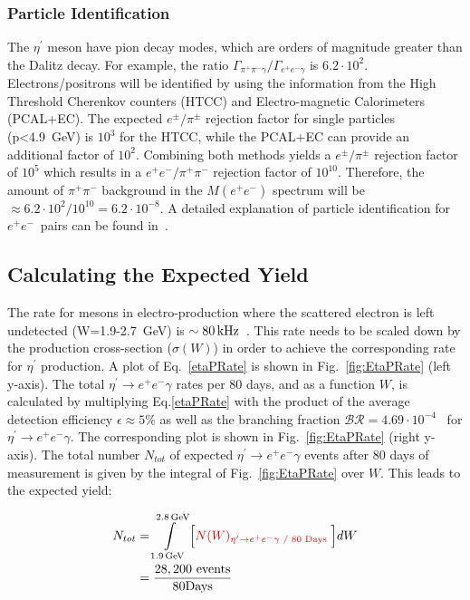 \documentclass[11pt,a4paper,twocolumn]{article}
\def\etaP{\eta^{\prime}}
\def\epemT{$ e^+e^-  $}
\def\epem{e^+e^-}
\begin{document}
\subsubsection{Particle Identification}
The $\etaP$ meson have pion decay modes, which are orders of magnitude greater than the Dalitz decay. For example, the ratio $\Gamma_{\pi^+\pi^-\gamma} / \Gamma_{e^+e^- \gamma} $ is $ 6.2\cdot 10^2$. 
Electrons/positrons will be identified by using the information from the High Threshold Cherenkov counters (HTCC) and Electro-magnetic Calorimeters (PCAL+EC). The expected $e^\pm/\pi^\pm$ rejection factor for single particles (p<4.9~GeV) is $10^3$ for the HTCC, while the PCAL+EC can provide an additional factor of $10^2$. Combining both methods yields a $e^\pm/\pi^\pm$ rejection factor of $10^5$ which results in a $e^+e^-/\pi^+\pi^-$ rejection factor of $10^{10}$. Therefore, the amount of $\pi^+\pi^-$ background in the $M(\epem)$ spectrum will be $\approx 6.2\cdot 10^2/10^{10} = 6.2\cdot10^{-8}$. A detailed explanation of particle identification for \epemT \ pairs can be found in~\cite{clas.proposal.jpsi}.
\FloatBarrier
\subsection{Calculating the Expected Yield}\label{sec:yield}						
The rate for mesons in electro-production where the scattered electron is left undetected (W=1.9-2.7~GeV) is $\sim 80\,\rm{kHz}$~\cite{Sargsyan}. This rate needs to be scaled down by the production cross-section ($\sigma(W)$) in order to achieve the corresponding rate for $\etaP$ production. 
A plot of Eq.~\ref{etaPRate} is shown in Fig.~\ref{fig:EtaPRate} (left y-axis). The total $\etaP\rightarrow\epem\gamma$ rates per 80 days, and as a function $W$, is calculated by multiplying Eq.\ref{etaPRate} with the product of the average detection efficiency $\epsilon\approx 5\%$ as well as the branching fraction $\mathcal{BR} = 4.69\cdot10^{-4}$~\cite{BESIII} for $\etaP\rightarrow\epem\gamma$. The corresponding plot is shown in Fig.~\ref{fig:EtaPRate} (right y-axis). The total number $N_{tot}$ of expected $\etaP\rightarrow\epem\gamma$ events after 80 days of measurement is given by the integral of Fig.~\ref{fig:EtaPRate} over $W$. This leads to the expected yield:
						
\begin{align}
	N_{tot} &= \int\limits_{1.9\,\rm{GeV}}^{2.8\,\rm{GeV}} \Big[ {\color{red}{N(W)_{\etaP\rightarrow\epem\gamma\text{ / 80 Days }}}} \Big]dW   \\ & =  \mathrm{\frac{28,200 \ events}{80 Days}}
\label{yield}
\end{align}
						
\end{document}
